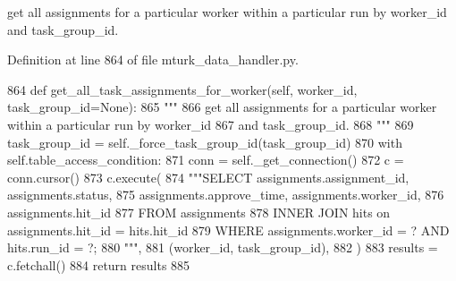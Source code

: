 \begin{DoxyVerb}get all assignments for a particular worker within a particular run by worker_id
and task_group_id.
\end{DoxyVerb}
 

Definition at line 864 of file mturk\+\_\+data\+\_\+handler.\+py.


\begin{DoxyCode}
864     \textcolor{keyword}{def }get\_all\_task\_assignments\_for\_worker(self, worker\_id, task\_group\_id=None):
865         \textcolor{stringliteral}{"""}
866 \textcolor{stringliteral}{        get all assignments for a particular worker within a particular run by worker\_id}
867 \textcolor{stringliteral}{        and task\_group\_id.}
868 \textcolor{stringliteral}{        """}
869         task\_group\_id = self.\_force\_task\_group\_id(task\_group\_id)
870         with self.table\_access\_condition:
871             conn = self.\_get\_connection()
872             c = conn.cursor()
873             c.execute(
874                 \textcolor{stringliteral}{"""SELECT assignments.assignment\_id, assignments.status,}
875 \textcolor{stringliteral}{                         assignments.approve\_time, assignments.worker\_id,}
876 \textcolor{stringliteral}{                         assignments.hit\_id}
877 \textcolor{stringliteral}{                         FROM assignments}
878 \textcolor{stringliteral}{                         INNER JOIN hits on assignments.hit\_id = hits.hit\_id}
879 \textcolor{stringliteral}{                         WHERE assignments.worker\_id = ? AND hits.run\_id = ?;}
880 \textcolor{stringliteral}{                         """},
881                 (worker\_id, task\_group\_id),
882             )
883             results = c.fetchall()
884             \textcolor{keywordflow}{return} results
885 
\end{DoxyCode}
\mbox{\label{classparlai_1_1mturk_1_1core_1_1dev_1_1mturk__data__handler_1_1MTurkDataHandler_a497bab989cb0979d44136b232a99f9a7}} 
